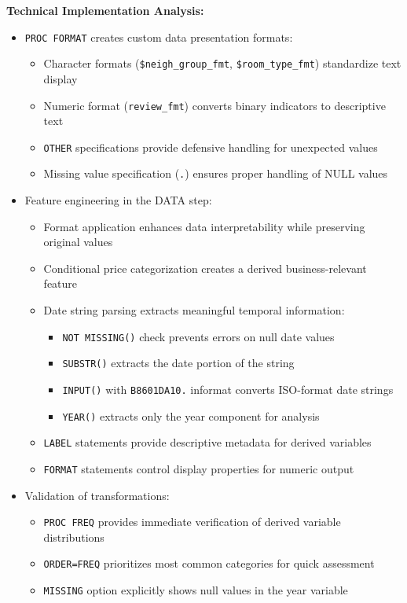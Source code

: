 \documentclass{article}
\begin{document}
\noindent
\textbf{Technical Implementation Analysis:}
\begin{itemize}[leftmargin=*]
    \item \texttt{PROC FORMAT} creates custom data presentation formats:
    \begin{itemize}
        \item Character formats (\texttt{\$neigh\_group\_fmt}, \texttt{\$room\_type\_fmt}) standardize text display
        \item Numeric format (\texttt{review\_fmt}) converts binary indicators to descriptive text
        \item \texttt{OTHER} specifications provide defensive handling for unexpected values
        \item Missing value specification (\texttt{.}) ensures proper handling of NULL values
    \end{itemize}

    \item Feature engineering in the DATA step:
    \begin{itemize}
        \item Format application enhances data interpretability while preserving original values
        \item Conditional price categorization creates a derived business-relevant feature
        \item Date string parsing extracts meaningful temporal information:
        \begin{itemize}
            \item \texttt{NOT MISSING()} check prevents errors on null date values
            \item \texttt{SUBSTR()} extracts the date portion of the string
            \item \texttt{INPUT()} with \texttt{B8601DA10.} informat converts ISO-format date strings
            \item \texttt{YEAR()} extracts only the year component for analysis
        \end{itemize}
        \item \texttt{LABEL} statements provide descriptive metadata for derived variables
        \item \texttt{FORMAT} statements control display properties for numeric output
    \end{itemize}

    \item Validation of transformations:
    \begin{itemize}
        \item \texttt{PROC FREQ} provides immediate verification of derived variable distributions
        \item \texttt{ORDER=FREQ} prioritizes most common categories for quick assessment
        \item \texttt{MISSING} option explicitly shows null values in the year variable
    \end{itemize}
\end{itemize}
\end{document}
